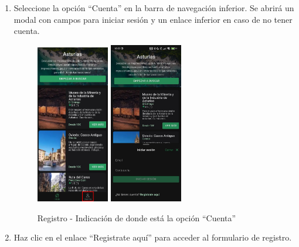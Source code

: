 \begin{enumerate}
	\item Seleccione la opción “Cuenta” en la barra de navegación inferior.
	      Se abrirá un modal con campos para iniciar sesión y un enlace inferior en caso de no tener cuenta.
	      \begin{figure}[H]
		      \centering
		      \includegraphics[width=0.3\textwidth]{7-Construccion/Manuales/app/P1-Registro.png}
		      \includegraphics[width=0.3\textwidth]{7-Construccion/Manuales/app/inicio de sesion.png}
		      \caption{Registro - Indicación de donde está la opción “Cuenta” }
	      \end{figure}
	\item Haz clic en el enlace “Registrate aquí” para acceder al formulario de registro.
	      \begin{figure}[H]
		      \centering

\end{figure}
\end{enumerate}
